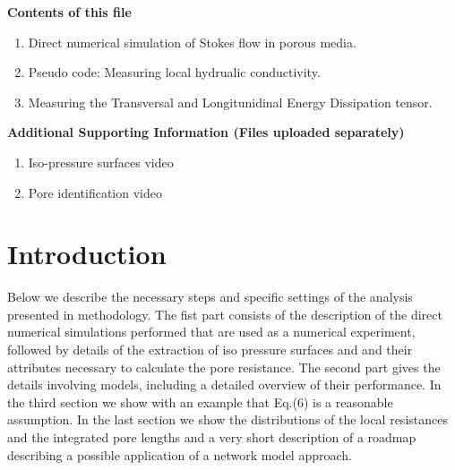 \documentclass[draft,jgrga]{agutexSI2019}
\begin{document}
\begin{article}

%
%



\noindent\textbf{Contents of this file}
\begin{enumerate}
\item Direct numerical simulation of Stokes flow in porous media.
\item Pseudo code: Measuring local hydrualic conductivity.
\item Measuring the Transversal and Longitunidinal Energy Dissipation tensor.
\end{enumerate}
\noindent\textbf{Additional Supporting Information (Files uploaded separately)}
\begin{enumerate}
\item Iso-pressure surfaces video
\item Pore identification video
\end{enumerate}

\section*{Introduction}


Below we describe the necessary steps and specific settings of the analysis presented in methodology. The fist part consists of the description of the direct numerical simulations performed that are used as a numerical experiment, followed by details of the extraction of iso pressure surfaces and and their attributes necessary to calculate the pore resistance. The second part gives the details involving models, including a detailed overview of their performance. In the third section we show with an example that Eq.(6) is a reasonable assumption. In the last section we show the distributions of the local resistances and the integrated pore lengths and a very short description of a roadmap describing a possible application of a network model approach. 



\end{article}
\end{document}
